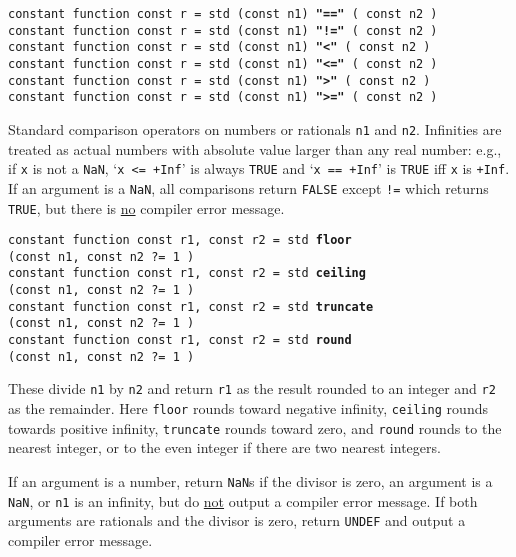\documentclass[12pt]{article}
\newcommand{\ttkey}[1]{{\tt \bfseries #1}}
\newenvironment{indpar}[1][0.3in]%
	{\begin{list}{}%
		     {\setlength{\itemsep}{0in}%
		      \setlength{\topsep}{0in}%
		      \setlength{\parsep}{1ex}%
		      \setlength{\labelwidth}{#1}%
		      \setlength{\leftmargin}{#1}%
		      \addtolength{\leftmargin}{\labelsep}}%
	 \item}%
	{\end{list}}
\begin{document}
{\tt constant function const r = std (const n1) \ttkey{"=="} ( const n2 )} \\
{\tt constant function const r = std (const n1) \ttkey{"!="} ( const n2 )} \\
{\tt constant function const r = std (const n1) \ttkey{"<"} ( const n2 )} \\
{\tt constant function const r = std (const n1) \ttkey{"<="} ( const n2 )} \\
{\tt constant function const r = std (const n1) \ttkey{">"} ( const n2 )} \\
{\tt constant function const r = std (const n1) \ttkey{">="} ( const n2 )}
\begin{indpar}
Standard comparison operators on numbers or rationals {\tt n1} and {\tt n2}.
Infinities are treated as actual numbers with absolute value
larger than any real number: e.g., if {\tt x} is not a {\tt NaN},
`{\tt x <= +Inf}' is always
{\tt TRUE} and `{\tt x == +Inf}' is {\tt TRUE} iff {\tt x} is {\tt +Inf}.
If an argument is a {\tt NaN}, all comparisons return {\tt FALSE}
except {\tt !=} which returns {\tt TRUE}, but there is \underline{no} compiler
error message.
\end{indpar}

{\tt constant function const r1, const r2 = std \ttkey{floor} \\
\hspace*{0.5in}(const n1, const n2 ?=~1 )} \\
{\tt constant function const r1, const r2 = std \ttkey{ceiling} \\
\hspace*{0.5in}(const n1, const n2 ?=~1 )} \\
{\tt constant function const r1, const r2 = std \ttkey{truncate} \\
\hspace*{0.5in}(const n1, const n2 ?=~1 )} \\
{\tt constant function const r1, const r2 = std \ttkey{round} \\
\hspace*{0.5in}(const n1, const n2 ?=~1 )}
\begin{indpar}
These divide {\tt n1} by {\tt n2} and return {\tt r1} as the
result rounded to an integer and {\tt r2} as the remainder.
Here {\tt floor} rounds toward negative infinity, {\tt ceiling}
rounds towards positive infinity, {\tt truncate} rounds toward
zero, and {\tt round} rounds to the nearest integer, or to the
even integer if there are two nearest integers.

If an argument is a number, return {\tt NaN}s if the divisor is
zero, an argument is a {\tt NaN}, or {\tt n1} is an infinity, but
do \underline{not} output a compiler error message.  If both
arguments are rationals and the divisor is zero, return
{\tt UNDEF} and output a compiler error message.
\end{indpar}
\end{document}
